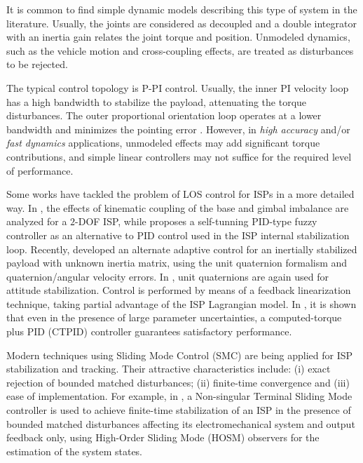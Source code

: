 It is common to find simple dynamic models describing this type of system in the literature. Usually, the joints are considered as decoupled and a double integrator with an inertia gain relates the joint 
torque and position.
%
Unmodeled dynamics, such as the vehicle motion and cross-coupling effects, are treated as disturbances to be rejected.

The typical control topology is P-PI control. Usually, the inner PI velocity loop has a high bandwidth to stabilize the payload, attenuating the torque disturbances. The outer proportional orientation loop operates at a lower bandwidth and minimizes the pointing error \cite{Hilkert2008, Masten2008, Kennedy2014}.
%
However, in \textit{high accuracy} and/or \textit{fast dynamics} applications, unmodeled effects may add significant torque contributions, and simple linear controllers may not suffice for the required level of performance.
%

Some works have tackled the problem of LOS control for ISPs in a more detailed way. 
%
%
In \cite{Abdo2013}, the effects of kinematic coupling of the base and gimbal imbalance are analyzed for a $2$-DOF ISP, while \cite{Abdo2014} proposes a self-tunning PID-type fuzzy controller as an alternative to PID control used in the ISP internal stabilization loop.
%
Recently, \cite{Cabarbaye2017} developed an alternate adaptive control for an inertially stabilized payload with unknown inertia matrix, using the unit quaternion formalism and quaternion/angular velocity errors.
%
In \cite{Konigseder2017}, unit quaternions are again used for attitude stabilization. 
%
Control is performed by means of a feedback linearization technique, taking partial advantage of the ISP Lagrangian model.
%
In \cite{Reis2018}, it is shown that even in the presence of large parameter uncertainties, a computed-torque plus PID (CTPID) controller guarantees satisfactory performance.

Modern techniques using Sliding Mode Control (SMC) are being applied for ISP stabilization and tracking.
%
Their attractive characteristics include: (i) exact rejection of bounded matched disturbances; (ii) finite-time convergence and (iii) ease of implementation.
%
For example, in \cite{Mao2017}, a Non-singular Terminal Sliding Mode controller \cite{Feng2002} is used to achieve finite-time stabilization of an ISP in the presence of bounded matched disturbances affecting its electromechanical system and output feedback only, using High-Order Sliding Mode (HOSM) observers for the estimation of the system states.
%

